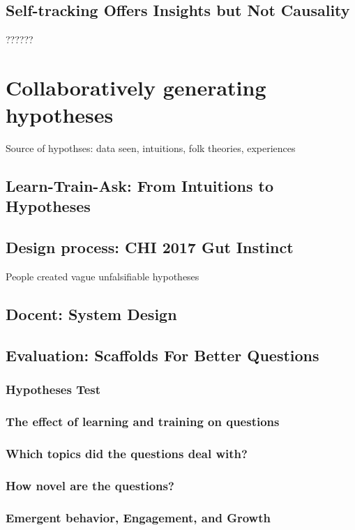 \section{Self-tracking Offers Insights but Not Causality}
??????

\chapter{Collaboratively generating hypotheses}
Source of hypothses: data seen, intuitions, folk theories, experiences

\section{Learn-Train-Ask: From Intuitions to Hypotheses}
\section{Design process: CHI 2017 Gut Instinct}
People created vague unfalsifiable hypotheses

\section{Docent: System Design}
\section{Evaluation: Scaffolds For Better Questions}
 \subsection{Hypotheses Test}
 \subsection{The effect of learning and training on questions}
 \subsection{Which topics did the questions deal with?}
 \subsection{How novel are the questions?}
 \subsection{Emergent behavior, Engagement, and Growth}

